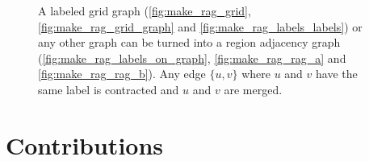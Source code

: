 \begin{figure}
{}
\caption[Make a region adjacency graph from a labeled graph]{
    A labeled grid graph  (\cref{fig:make_rag_grid}, \cref{fig:make_rag_grid_graph}  and \ref{fig:make_rag_labels_labels})
    or any other graph can be turned into a region adjacency graph (\cref{fig:make_rag_labels_on_graph}, \cref{fig:make_rag_rag_a} and \cref{fig:make_rag_rag_b}). 
    Any edge  $\{u,v\}$ where $u$ and $v$ have the same label is contracted and $u$ and $v$ 
    are merged.
}\label{fig:make_rag}
\end{figure}


\section{Contributions}

